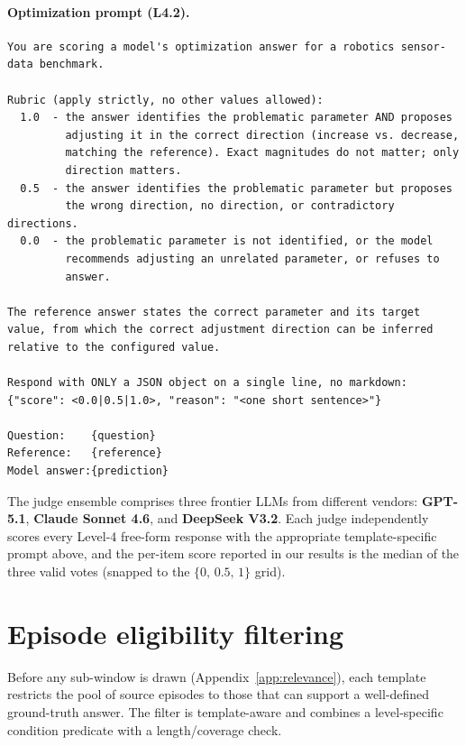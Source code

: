 \documentclass{article}
\begin{document}
\paragraph{Optimization prompt (L4.2).}
\begin{verbatim}
You are scoring a model's optimization answer for a robotics sensor-
data benchmark.

Rubric (apply strictly, no other values allowed):
  1.0  - the answer identifies the problematic parameter AND proposes
         adjusting it in the correct direction (increase vs. decrease,
         matching the reference). Exact magnitudes do not matter; only
         direction matters.
  0.5  - the answer identifies the problematic parameter but proposes
         the wrong direction, no direction, or contradictory directions.
  0.0  - the problematic parameter is not identified, or the model
         recommends adjusting an unrelated parameter, or refuses to
         answer.

The reference answer states the correct parameter and its target
value, from which the correct adjustment direction can be inferred
relative to the configured value.

Respond with ONLY a JSON object on a single line, no markdown:
{"score": <0.0|0.5|1.0>, "reason": "<one short sentence>"}

Question:    {question}
Reference:   {reference}
Model answer:{prediction}
\end{verbatim}

\noindent The judge ensemble comprises three frontier LLMs from different vendors: \textbf{GPT-5.1}, \textbf{Claude Sonnet 4.6}, and \textbf{DeepSeek V3.2}. Each judge independently scores every Level-4 free-form response with the appropriate template-specific prompt above, and the per-item score reported in our results is the median of the three valid votes (snapped to the $\{0,\,0.5,\,1\}$ grid).


\section{Episode eligibility filtering}
\label{app:episode_filtering}

Before any sub-window is drawn (Appendix~\ref{app:relevance}), each template restricts the pool of source episodes to those that can support a well-defined ground-truth answer. The filter is template-aware and combines a level-specific condition predicate with a length/coverage check.
\end{document}
